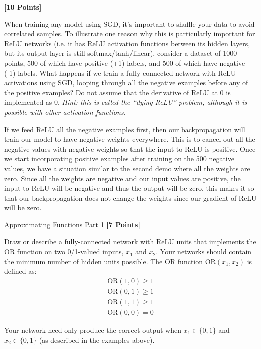 \problem \textbf{[10 Points]}

When training any model using SGD, it's important to shuffle your data to avoid correlated samples. To illustrate one reason why this is particularly important for ReLU networks (i.e. it has ReLU activation functions between its hidden layers, but its output layer is still softmax/tanh/linear), consider a dataset of 1000 points, 500 of which have positive (+1) labels, and 500 of which have negative (-1) labels. What happens if we train a fully-connected network with ReLU activations using SGD, looping through all the negative examples before any of the positive examples? Do not assume that the derivative of ReLU at 0 is implemented as 0. \textit{Hint: this is called the ``dying ReLU'' problem, although it is possible with other activation functions.}

\textit{}

\begin{solution}
  If we feed ReLU all the negative examples first, then our backpropagation will train our model to have negative weights everywhere. This is to cancel out all the negative values with negative weights so that the input to ReLU is positive. Once we start incorporating positive examples after training on the 500 negative values, we have a situation similar to the second demo where all the weights are zero. Since all the weights are negative and our input values are positive, the input to ReLU will be negative and thus the output will be zero, this makes it so that our backpropagation does not change the weights since our gradient of ReLU will be zero. 
\end{solution}



\problem Approximating Functions Part 1 \textbf{[7 Points]}

Draw or describe a fully-connected network with ReLU units that implements the OR function on two 0/1-valued inputs,  $x_1$ and $x_2$.  Your networks should contain the minimum number of hidden units possible.  The OR function $\text{OR}(x_1, x_2)$ is defined as:
\begin{gather*}
\text{OR}(1, 0) \geq 1 \\
\text{OR}(0, 1) \geq 1 \\
\text{OR}(1, 1) \geq 1 \\
\text{OR}(0, 0) = 0
\end{gather*}

Your network need only produce the correct output when $x_1 \in \{0, 1\}$ and $x_2 \in \{0, 1\}$ (as described in the examples above).

